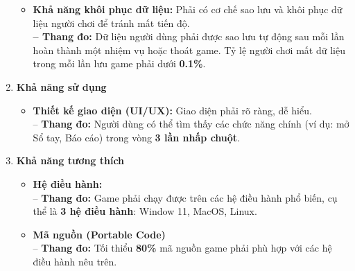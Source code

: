 \begin{enumerate}
\begin{itemize}
        \item \textbf{Khả năng khôi phục dữ liệu:}
        Phải có cơ chế sao lưu và khôi phục dữ liệu người chơi để tránh mất tiến độ. \\
        \textbf{-- Thang đo:} Dữ liệu người dùng phải được sao lưu tự động sau mỗi lần hoàn thành một nhiệm vụ hoặc thoát game. Tỷ lệ người chơi mất dữ liệu trong mỗi lần lưu game phải dưới \textbf{0.1\%}.
    \end{itemize}

    \item \textbf{Khả năng sử dụng}
    \begin{itemize}
        \item \textbf{Thiết kế giao diện (UI/UX):}
        Giao diện phải rõ ràng, dễ hiểu. \\
        -- \textbf{Thang đo:} Người dùng có thể tìm thấy các chức năng chính (ví dụ: mở Sổ tay, Báo cáo) trong vòng \textbf{3 lần nhấp chuột}.
    \end{itemize}

    \item \textbf{Khả năng tương thích}
    \begin{itemize}
        \item \textbf{Hệ điều hành:} \\
        -- \textbf{Thang đo:} Game phải chạy được trên các hệ điều hành phổ biến, cụ thể là \textbf{3 hệ điều hành}: Window 11, MacOS, Linux.

        \item \textbf{Mã nguồn (Portable Code)} \\
        -- \textbf{Thang đo:} Tối thiểu \textbf{80\%} mã nguồn game phải phù hợp với các hệ điều hành nêu trên.
    \end{itemize}


\end{enumerate}


